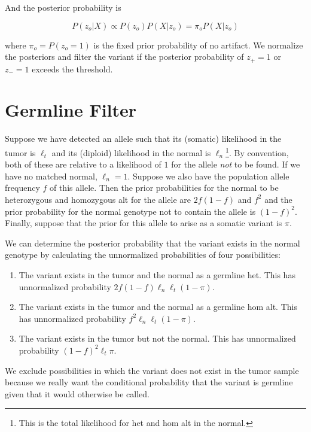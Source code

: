 \documentclass[nofootinbib,amssymb,amsmath]{revtex4}
\begin{document}
And the posterior probability is

\begin{equation}
P(z_o | X) \propto P(z_o) P(X | z_o) =  \pi_o P(X | z_o) 
\end{equation}

where $\pi_o = P(z_o = 1)$ is the fixed prior probability of no artifact. We normalize the posteriors and filter the variant if the posterior probability of $z_+ = 1$ or $z_- = 1$ exceeds the threshold.

\section{Germline Filter}\label{germline-filter}
Suppose we have detected an allele such that its (somatic) likelihood in the tumor is $\ell_t$ and its (diploid) likelihood in the normal is $\ell_n$\footnote{This is the total likelihood for het and hom alt in the normal.}.  By convention, both of these are relative to a likelihood of $1$ for the allele \textit{not} to be found.  If we have no matched normal, $\ell_n = 1$.  Suppose we also have the population allele frequency $f$ of this allele.  Then the prior probabilities for the normal to be heterozygous and homozygous alt for the allele are $2f(1-f)$ and $f^2$ and the prior probability for the normal genotype not to contain the allele is $(1-f)^2$.  Finally, suppose that the prior for this allele to arise as a somatic variant is $\pi$.

We can determine the posterior probability that the variant exists in the normal genotype by calculating the unnormalized probabilities of four possibilities:
\begin{enumerate}
\item The variant exists in the tumor and the normal as a germline het.  This has unnormalized probability $2f(1-f) \ell_n \ell_t (1 - \pi)$.
\item The variant exists in the tumor and the normal as a germline hom alt.  This has unnormalized probability $f^2 \ell_n \ell_t (1 - \pi)$.
\item The variant exists in the tumor but not the normal.  This has unnormalized probability $(1-f)^2 \ell_t \pi$.
\end{enumerate}

We exclude possibilities in which the variant does not exist in the tumor sample because we really want the conditional probability that the variant is germline given that it would otherwise be called.
\end{document}
